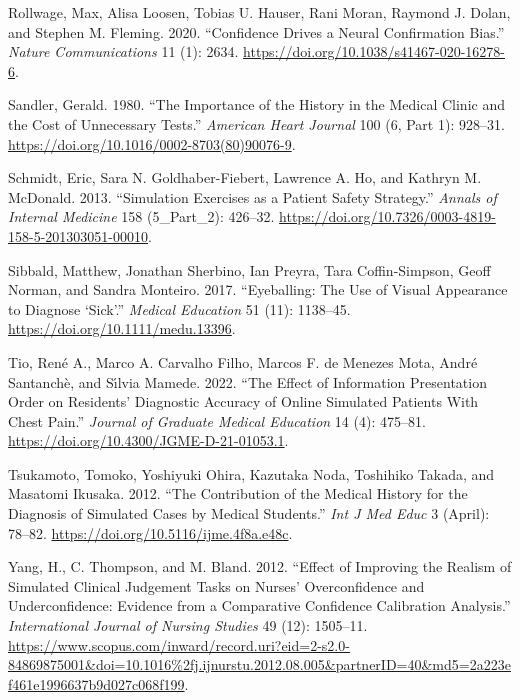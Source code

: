 \documentclass[a4paper, nobind]{templates/ociamthesis}
\newlength{\cslhangindent}
\newenvironment{CSLReferences}[2] %
 {%
  \setlength{\parindent}{0pt}
  \ifodd #1
  \let\oldpar\par
  \def\par{\hangindent=\cslhangindent\oldpar}
  \fi
  \setlength{\parskip}{1mm}
  \setlength{\baselineskip}{6mm}
 }%
 {}
\begin{document}
\begin{CSLReferences}{1}{0}
Rollwage, Max, Alisa Loosen, Tobias U. Hauser, Rani Moran, Raymond J. Dolan, and Stephen M. Fleming. 2020. {``Confidence Drives a Neural Confirmation Bias.''} \emph{Nature Communications} 11 (1): 2634. \url{https://doi.org/10.1038/s41467-020-16278-6}.

Sandler, Gerald. 1980. {``The Importance of the History in the Medical Clinic and the Cost of Unnecessary Tests.''} \emph{American Heart Journal} 100 (6, Part 1): 928--31. \url{https://doi.org/10.1016/0002-8703(80)90076-9}.

Schmidt, Eric, Sara N. Goldhaber-Fiebert, Lawrence A. Ho, and Kathryn M. McDonald. 2013. {``Simulation {Exercises} as a {Patient} {Safety} {Strategy}.''} \emph{Annals of Internal Medicine} 158 (5\_Part\_2): 426--32. \url{https://doi.org/10.7326/0003-4819-158-5-201303051-00010}.

Sibbald, Matthew, Jonathan Sherbino, Ian Preyra, Tara Coffin-Simpson, Geoff Norman, and Sandra Monteiro. 2017. {``Eyeballing: The Use of Visual Appearance to Diagnose {`Sick'}.''} \emph{Medical Education} 51 (11): 1138--45. \url{https://doi.org/10.1111/medu.13396}.

Tio, René A., Marco A. Carvalho Filho, Marcos F. de Menezes Mota, André Santanchè, and Sı́lvia Mamede. 2022. {``The {Effect} of {Information} {Presentation} {Order} on {Residents}' {Diagnostic} {Accuracy} of {Online} {Simulated} {Patients} {With} {Chest} {Pain}.''} \emph{Journal of Graduate Medical Education} 14 (4): 475--81. \url{https://doi.org/10.4300/JGME-D-21-01053.1}.

Tsukamoto, Tomoko, Yoshiyuki Ohira, Kazutaka Noda, Toshihiko Takada, and Masatomi Ikusaka. 2012. {``The Contribution of the Medical History for the Diagnosis of Simulated Cases by Medical Students.''} \emph{Int J Med Educ} 3 (April): 78--82. \url{https://doi.org/10.5116/ijme.4f8a.e48c}.

Yang, H., C. Thompson, and M. Bland. 2012. {``Effect of Improving the Realism of Simulated Clinical Judgement Tasks on Nurses' Overconfidence and Underconfidence: Evidence from a Comparative Confidence Calibration Analysis.''} \emph{International Journal of Nursing Studies} 49 (12): 1505--11. \url{https://www.scopus.com/inward/record.uri?eid=2-s2.0-84869875001&doi=10.1016\%2fj.ijnurstu.2012.08.005&partnerID=40&md5=2a223ef461e1996637b9d027c068f199}.


\end{CSLReferences}
\end{document}
